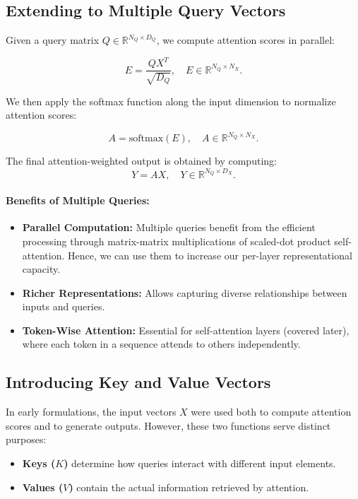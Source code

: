 \subsection{Extending to Multiple Query Vectors}
\label{sec:chapter17_multiple_queries}

\noindent Given a query matrix \( Q \in \mathbb{R}^{N_Q \times D_Q} \), we compute attention scores in parallel:

\begin{equation}
    E = \frac{Q X^T}{\sqrt{D_Q}}, \quad E \in \mathbb{R}^{N_Q \times N_X}.
\end{equation}

\noindent We then apply the softmax function along the input dimension to normalize attention scores:

\begin{equation}
    A = \text{softmax}(E), \quad A \in \mathbb{R}^{N_Q \times N_X}.
\end{equation}

\noindent The final attention-weighted output is obtained by computing:
\begin{equation}
    Y = A X, \quad Y \in \mathbb{R}^{N_Q \times D_X}.
\end{equation}

\paragraph{Benefits of Multiple Queries:}
\begin{itemize}
    \item \textbf{Parallel Computation:} Multiple queries benefit from the efficient processing through matrix-matrix multiplications of scaled-dot product self-attention. Hence, we can use them to increase our per-layer representational capacity. 
    \item \textbf{Richer Representations:} Allows capturing diverse relationships between inputs and queries.
    \item \textbf{Token-Wise Attention:} Essential for self-attention layers (covered later), where each token in a sequence attends to others independently.
\end{itemize}

\subsection{Introducing Key and Value Vectors}
\label{sec:chapter17_keys_values}

\noindent In early formulations, the input vectors \( X \) were used both to compute attention scores and to generate outputs. However, these two functions serve distinct purposes:
\begin{itemize}
    \item \textbf{Keys (\( K \))} determine how queries interact with different input elements.
    \item \textbf{Values (\( V \))} contain the actual information retrieved by attention.
\end{itemize}


